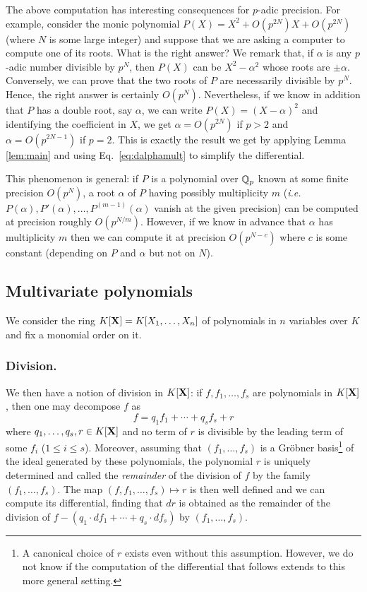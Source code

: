 \documentclass{lms}
\begin{document}
The above computation has interesting consequences for $p$-adic 
precision. For example, consider the monic 
polynomial $P(X) = X^2 + O(p^{2N}) X + O(p^{2N})$ (where $N$ is some 
large integer) and suppose that we are asking a computer to compute one 
of its roots. What is the right answer? We remark that, if $\alpha$ is 
any $p$-adic number divisible by $p^N$, then $P(X)$ can be $X^2 - 
\alpha^2$ whose roots are $\pm \alpha$. Conversely, we can prove that 
the two roots of $P$ are necessarily divisible by $p^N$. Hence, the
right answer is certainly $O(p^N)$. Nevertheless, if we know in addition 
that $P$ has a double root, say $\alpha$, we can write $P(X) = (X - 
\alpha)^2$ and identifying the coefficient in $X$, we get $\alpha =
O(p^{2N})$ if $p > 2$ and $\alpha = O(p^{2N-1})$ if $p=2$.
This is exactly the result we get by applying Lemma \ref{lem:main} and
using Eq.~\eqref{eq:dalphamult} to simplify the differential.

This phenomenon is general: if $P$ is a polynomial over $\mathbb Q_p$ known at 
some finite precision $O(p^N)$, a root $\alpha$ of $P$ having possibly 
multiplicity $m$ (\emph{i.e.} $P(\alpha), P'(\alpha), \ldots, P^{(m-1)} 
(\alpha)$ vanish at the given precision) can be computed at precision 
roughly $O(p^{N/m})$. However, if we know in advance that $\alpha$ has 
multiplicity $m$ then we can compute it at precision $O(p^{N-c})$ 
where $c$ is some constant (depending on $P$ and $\alpha$ but not on
$N$).

\subsection{Multivariate polynomials}

We consider the ring $K[\mathbf X] = K[X_1, \ldots, X_n]$ of polynomials in $n$
variables over $K$ and fix a monomial order on it. 

\subsubsection*{Division.}

We then have a notion of division in $K[\mathbf X]$: if $f, f_1, \ldots, f_s$ 
are polynomials in $K[\mathbf X]$, then one may decompose $f$ as
$$f = q_1 f_1 + \cdots + q_s f_s + r$$
where $q_1, \ldots, q_s, r \in K[\mathbf X]$ and no term of $r$ is divisible
by the leading term of some $f_i$ ($1 \leq i \leq s$). Moreover, assuming
that $(f_1, \ldots, f_s)$ is a Gr\"obner basis\footnote{A canonical choice of $r$ exists even without this
assumption. However, we do not know
if the computation of the differential that follows extends to this more
general setting.} of the ideal generated by these polynomials, the 
polynomial $r$ is uniquely determined and called the \emph{remainder} of 
the division of $f$ by the family $(f_1, \ldots, f_s)$. The map 
$(f, f_1, \ldots, f_s) \mapsto r$ is then well defined and we can compute its differential,
finding that $dr$ is obtained as the remainder of the division of $f - (q_1 
\cdot d f_1 + \cdots + q_s \cdot d f_s)$ by $(f_1, \ldots, f_s)$.
\end{document}
